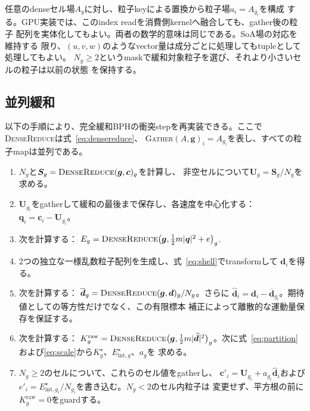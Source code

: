 \documentclass[a4paper,11pt]{ltjsarticle}
\newcommand{\vect}[1]{\bm{#1}}
\begin{document}
任意のdenseセル場$A_g$に対し、粒子keyによる置換から粒子場$a_i=A_{g_i}$を構成
する。GPU実装では、このindex readを消費側kernelへ融合しても、gather後の粒子
配列を実体化してもよい。両者の数学的意味は同じである。SoA場の対応を維持する
限り、$(u,v,w)$のようなvector量は成分ごとに処理してもtupleとして処理してもよい。
$N_g\geq2$というmaskで緩和対象粒子を選び、それより小さいセルの粒子は以前の状態
を保持する。

\subsection{並列緩和}

以下の手順により、完全緩和BPHの衝突stepを再実装できる。ここで
\textsc{DenseReduce}は式~\eqref{eq:densereduce}、
\textsc{Gather}$(A,\vect{g})_i=A_{g_i}$を表し、すべての粒子mapは並列である。
\begin{enumerate}[label=\arabic*.]
 \item $N_g$と$\vect{S}_g=\textsc{DenseReduce}(\vect{g},\vect{c})_g$を計算し、
       非空セルについて$\vect{U}_g=\vect{S}_g/N_g$を求める。
 \item $\vect{U}_{g_i}$をgatherして緩和の最後まで保存し、各速度を中心化する：
       $\vect{q}_i=\vect{c}_i-\vect{U}_{g_i}$。
 \item 次を計算する：
       $E_g=\textsc{DenseReduce}\bigl(\vect{g},
       \tfrac12m|\vect{q}|^2+e\bigr)_g$.
 \item 2つの独立な一様乱数粒子配列を生成し、式~\eqref{eq:shell}でtransformして
       $\vect{d}_i$を得る。
 \item 次を計算する：
       $\overline{\vect{d}}_g=
       \textsc{DenseReduce}(\vect{g},\vect{d})_g/N_g$。さらに
       $\widehat{\vect{d}}_i=\vect{d}_i-
       \overline{\vect{d}}_{g_i}$。期待値としての等方性だけでなく、この有限標本
       補正によって離散的な運動量保存を保証する。
 \item 次を計算する：
       $K_g^{\mathrm{raw}}=\textsc{DenseReduce}\bigl(\vect{g},
       \tfrac12m|\widehat{\vect{d}}|^2\bigr)_g$。次に式~\eqref{eq:partition}
       および\eqref{eq:scale}から$K_g^\star$、$E_{\mathrm{int},g}^\star$、$a_g$を
       求める。
 \item $N_g\geq2$のセルについて、これらのセル値をgatherし、
       $\vect{c}'_i=\vect{U}_{g_i}+a_{g_i}\widehat{\vect{d}}_i$および
       $e'_i=E_{\mathrm{int},g_i}^\star/N_{g_i}$を書き込む。$N_g<2$のセル内粒子は
       変更せず、平方根の前に$K_g^{\mathrm{raw}}=0$をguardする。
\end{enumerate}
\end{document}
